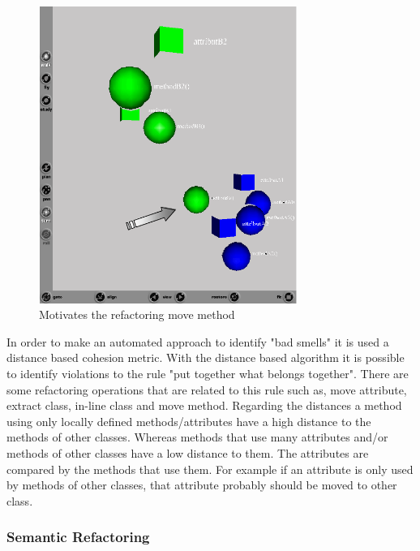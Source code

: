 \begin{figure}[h!]
  \centering
  \includegraphics[width=0.75\textwidth]{img/metricsbasedrefactoring.png}
  \caption{Motivates the refactoring move method}
  \label{fig:MetricsBasedRefactoring}
\end{figure}

In order to make an automated approach to identify "bad smells" it is used a distance based cohesion metric.
With the distance based algorithm it is possible to identify violations to the rule "put together what belongs together". 
There are some refactoring operations that are related to this rule such as, move attribute, extract class, in-line class and move method. 
Regarding the distances a method using only locally defined methods/attributes have a high distance to the methods of other classes. 
Whereas methods that use many attributes and/or methods of other classes have a low distance to them. 
The attributes are compared by the methods that use them. 
For example if an attribute is only used by methods of other classes, that attribute probably should be moved to other class.

\subsubsection{Semantic Refactoring}

